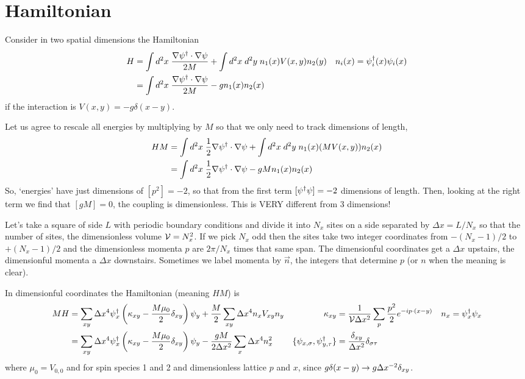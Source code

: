 \section{Hamiltonian}\label{sec:hamiltonian}

Consider in two spatial dimensions the Hamiltonian
\begin{align}
	H
	&= \int d^2x\; \frac{\nabla \psi{}^{\dagger} \cdot \nabla \psi}{2M} + \int d^2x\; d^2y\; n_1(x) V(x,y) n_2(y)
	&
	n_i(x) &= \psi{}^{\dagger}_i(x) \psi_i(x)
	\\
	&= \int d^2x\; \frac{\nabla \psi{}^{\dagger} \cdot \nabla \psi}{2M} - g n_1(x) n_2(x)
\end{align}
if the interaction is $V(x,y) = -g \delta(x-y)$.

Let us agree to rescale all energies by multiplying by $M$ so that we only need to track dimensions of length,
\begin{align}
	HM
	&= \int d^2x\; \frac{1}{2} \nabla \psi{}^{\dagger} \cdot \nabla \psi + \int d^2x\; d^2y\; n_1(x) (MV(x,y)) n_2(x)
	\\
	&= \int d^2x\; \frac{1}{2} \nabla \psi{}^{\dagger} \cdot \nabla \psi - gM n_1(x) n_2(x)
\end{align}
So, `energies' have just dimensions of $[p^2] = -2$, so that from the first term $[\psi{}^{\dagger}\psi] = -2$ dimensions of length.
Then, looking at the right term we find that $[gM] = 0$, the coupling is dimensionless.
This is VERY different from 3 dimensions!

Let's take a square of side $L$ with periodic boundary conditions and divide it into $N_x$ sites on a side separated by $\Delta x = L/N_x$ so that the number of sites, the dimensionless volume $\mathcal{V}=N_x^2$.
If we pick $N_x$ odd then the sites take two integer coordinates from $-(N_x-1)/2$ to $+(N_x-1)/2$ and the dimensionless momenta $p$ are $2\pi / N_x$ times that same span.
The dimensionful coordinates get a $\Delta x$ upstairs, the dimensionful momenta a $\Delta x$ downstairs.
Sometimes we label momenta by $\vec{n}$, the integers that determine $p$ (or $n$ when the meaning is clear).

In dimensionful coordinates the Hamiltonian (meaning $HM$) is
\begin{align}
	MH &= \sum_{xy}\Delta x^4 \psi{}^{\dagger}_x \left(\kappa_{xy} - \frac{M\mu_0}{2} \delta_{xy} \right)\psi_y + \frac{M}{2} \sum_{xy} \Delta x^4 n_x V_{xy} n_y
	&
    \kappa_{xy} &= \frac{1}{\mathcal{V} \Delta x^2} \sum_{p} \frac{p^2}{2} e^{-i p \cdot (x-y)}
	&
	n_x &= \psi{}^{\dagger}_x \psi_x
	\\
	&= \sum_{xy}\Delta x^4 \psi{}^{\dagger}_x \left(\kappa_{xy} - \frac{M\mu_0}{2} \delta_{xy}\right) \psi_y - \frac{gM}{2\Delta x^2} \sum_{x} \Delta x^4 n^2_x
	&
	\{\psi_{x,\sigma}, \psi{}^{\dagger}_{y,\tau} \} &= \frac{\delta_{xy}}{\Delta x^2} \delta_{\sigma\tau}
\end{align}
where $\mu_0 = V_{0,0}$ and for spin species 1 and 2 and dimensionless lattice $p$ and $x$, since $g\delta(x-y) \rightarrow g \Delta x^{-2} \delta_{xy}$.

